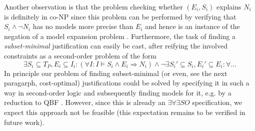Another observation is that the problem checking whether $(E_i,S_i)$ explains $N_i$ is definitely in co-NP since this problem can be performed by verifying that $S_i \land \lnot N_i$ has no models more precise than $E_i$ and hence is an instance of the negation of a model expansion problem \cite{ternovskaMXcomplexity}. 
Furthermore, the task of finding a \emph{subset-minimal} justification can easily be cast, after reifying the involved constraints as a second-order problem of the form
\[\exists S_i\subseteq T_P, E_i\subseteq I_i: (\forall I: I\models S_i\land E_i \Rightarrow N_i) \land \lnot \exists S_i'\subseteq S_i, E_i'\subseteq E_i: \forall ... \]
In principle our problem of finding subset-minimal (or even, see the next paragarph, cost-optimal) justifications could be solved by specifying it in such a way in second-order logic and subsequently finding models for it, e.g. by a reduction to QBF \cite{kr/BogaertsTS16,kr/vanderHallenJ18}. 
However, since this is already an $\exists\forall\exists SO$ specification, we expect this approach not be feasible (this expectation remains to be verified in future work). 



